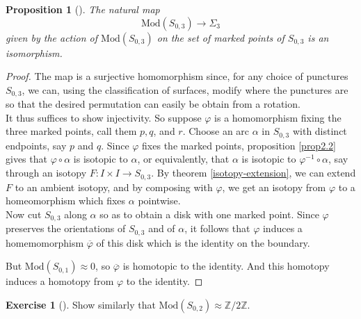 \documentclass[reqno]{amsart}
\newtheorem{proposition}[theorem]{Proposition}
\theoremstyle{definition}
\newtheorem{exercise}[theorem]{Exercise}
\theoremstyle{remark}
\newcommand{\Mod}{{\mathrm{Mod}}}
\begin{document}
\begin{proposition}[]
    The natural map
    \[
    \Mod\left( S_{0,3} \right) \to \Sigma_{3}
    \] 
    given by the action of $\Mod\left( S_{0,3} \right) $ on the
    set of marked points of $S_{0,3}$ is an isomorphism.
\end{proposition}

\begin{proof}

    The map is a surjective homomorphism since, for
    any choice of punctures $S_{0,3}$, we can, using the
    classification of surfaces, modify where the punctures
    are so that the desired permutation can easily be obtain from
    a rotation.\\
    \linebreak
    It thus suffices to show injectivity. So
    suppose $\varphi $ is a homomorphism fixing
    the three marked points, call them $p,q$, and $r$.
    Choose an arc $\alpha$ in $S_{0,3}$ with
    distinct endpoints, say $p$ and $q$.
    Since $\varphi $ fixes the marked points,
    proposition \ref{prop2.2} gives that
    $\varphi \circ \alpha$ is isotopic to $\alpha$,
    or equivalently, that $\alpha$ is
    isotopic to $\varphi^{-1} \circ \alpha$, say
    through an isotopy
    $F \colon I \times I \to S_{0,3}$.
    By theorem \ref{isotopy-extension}, we can
    extend $F$ to an ambient isotopy, and
    by composing with $\varphi $, we get an
    isotopy from $\varphi $ to
    a homeomorphism which fixes $\alpha$ pointwise.\\
    \linebreak
    Now cut $S_{0,3}$ along $\alpha$ so as to obtain
    a disk with one marked point. Since
    $\varphi $ preserves the orientations of
    $S_{0,3}$ and of $\alpha$, it follows that
    $\varphi $ induces a homemomorphism
    $\overline{\varphi }$ of this disk which is the
    identity on the boundary.

    But $\Mod \left( S_{0,1} \right) \approx 0$, so
    $\overline{\varphi }$ is homotopic to the identity.
    And this homotopy induces a homotopy from $\varphi $ to
    the identity.
\end{proof}




\begin{exercise}[]
    Show similarly that $\Mod \left( S_{0,2} \right) \approx
    \mathbb{Z}/ 2\mathbb{Z}$.
\end{exercise}
\end{document}
